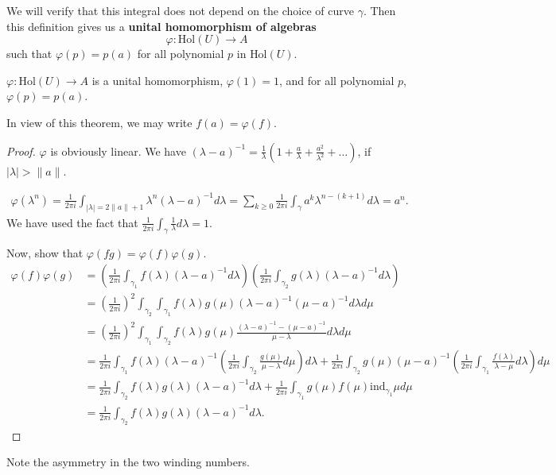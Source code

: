 We will verify that this integral does not depend on the choice of curve $\gamma$. Then this definition gives us a \textbf{unital homomorphism of algebras}
\[
	\varphi: \text{Hol}(U) \to A
\] 
such that $\varphi(p) = p(a)$ for all polynomial $p$ in $\text{Hol}(U)$.

\begin{theorem}
	\label{thm:UnitalHomCalculus}
	$\varphi: \text{Hol}(U) \to A$ is a unital homomorphism, $\varphi(1) = 1$, and for all polynomial $p$, $\varphi(p) = p(a)$.

	In view of this theorem, we may write $f(a) = \varphi(f)$.
\end{theorem}
\begin{proof}
	$\varphi$ is obviously linear. We have $(\lambda - a)^{- 1} = \frac{1}{\lambda} \left( 1 + \frac{a}{\lambda} +\frac{a^2}{\lambda^2} + \ldots \right) $, if $|\lambda| > \|a\|$. 

\begin{align*}
	\varphi(\lambda^n) = \frac{1}{2 \pi i} \int _{|\lambda| = 2 \|a\| + 1} \lambda^n (\lambda - a)^{- 1} d \lambda 
	= \sum_{k \ge 0} \frac{1}{2 \pi i}\int _\gamma a^k \lambda^{n - (k + 1)} d \lambda = a^n
.\end{align*}
We have used the fact that $\frac{1}{2 \pi i}\int _\gamma \frac{1}{\lambda} d \lambda = 1$.

Now, show that $\varphi(f g) = \varphi(f) \varphi(g) $.
\begin{align*}
	\varphi(f)\varphi(g)
	&= \left( \frac{1}{2 \pi i} \int _{\gamma_1} f(\lambda) (\lambda - a)^{-1} d \lambda \right)\left( \frac{1}{2 \pi i} \int _{\gamma_2} g(\lambda) (\lambda - a)^{-1} d \lambda \right)  \\
	&= (\frac{1}{2 \pi i})^2 \int _{\gamma_2} \int _{\gamma_1} f(\lambda) g(\mu) (\lambda - a)^{-1} (\mu - a)^{-1} d \lambda d \mu \\
	&= (\frac{1}{2 \pi i})^2 \int _{\gamma_1} \int _{\gamma_2} f(\lambda) g(\mu) \frac{(\lambda - a)^{-1} - (\mu - a)^{-1}}{\mu - \lambda} d \lambda d \mu \\
	&= \frac{1}{2 \pi i} \int _{\gamma_1} f(\lambda) (\lambda - a)^{-1} \left( \frac{1}{2 \pi i} \int _{\gamma_2} \frac{g(\mu)}{\mu - \lambda} d \mu \right) d \lambda
	+ \frac{1}{ 2 \pi i} \int _{\gamma_2} g (\mu) (\mu - a)^{-1} \left( \frac{1}{2 \pi i} \int _{\gamma_1} \frac{f(\lambda)}{ \lambda - \mu}d \lambda \right)  d \mu\\
	&= \frac{1}{2 \pi i} \int _{\gamma_2} f(\lambda) g(\lambda) (\lambda - a)^{-1} d \lambda
	+ \frac{1}{ 2 \pi i} \int _{\gamma_1} g(\mu) f(\mu) \text{ind}_{\gamma_1} \mu d \mu\\
	&= \frac{1}{2 \pi i} \int _{\gamma_2} f(\lambda) g(\lambda) (\lambda - a)^{-1} d \lambda
.\end{align*}
\end{proof}
\begin{remark}
	Note the asymmetry in the two winding numbers.
\end{remark}








